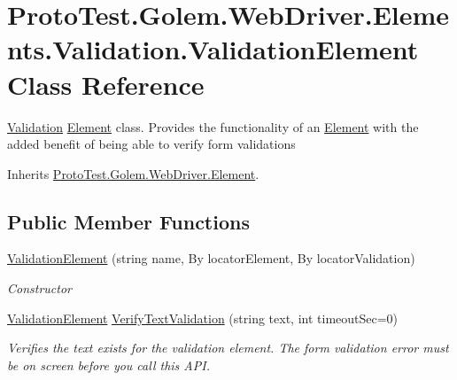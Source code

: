 \hypertarget{class_proto_test_1_1_golem_1_1_web_driver_1_1_elements_1_1_validation_1_1_validation_element}{\section{Proto\-Test.\-Golem.\-Web\-Driver.\-Elements.\-Validation.\-Validation\-Element Class Reference}
\label{class_proto_test_1_1_golem_1_1_web_driver_1_1_elements_1_1_validation_1_1_validation_element}
}


\hyperlink{namespace_proto_test_1_1_golem_1_1_web_driver_1_1_elements_1_1_validation}{Validation} \hyperlink{class_proto_test_1_1_golem_1_1_web_driver_1_1_element}{Element} class. Provides the functionality of an \hyperlink{class_proto_test_1_1_golem_1_1_web_driver_1_1_element}{Element} with the added benefit of being able to verify form validations  




Inherits \hyperlink{class_proto_test_1_1_golem_1_1_web_driver_1_1_element}{Proto\-Test.\-Golem.\-Web\-Driver.\-Element}.

\subsection*{Public Member Functions}
\begin{DoxyCompactItemize}
\item 
\hyperlink{class_proto_test_1_1_golem_1_1_web_driver_1_1_elements_1_1_validation_1_1_validation_element_a4e6e78fa9b8ead647c3b5c941dfe8276}{Validation\-Element} (string name, By locator\-Element, By locator\-Validation)
\begin{DoxyCompactList}\small\item\em Constructor \end{DoxyCompactList}\item 
\hyperlink{class_proto_test_1_1_golem_1_1_web_driver_1_1_elements_1_1_validation_1_1_validation_element}{Validation\-Element} \hyperlink{class_proto_test_1_1_golem_1_1_web_driver_1_1_elements_1_1_validation_1_1_validation_element_af36b5fd768f04aea3ebf4d45270d14b3}{Verify\-Text\-Validation} (string text, int timeout\-Sec=0)
\begin{DoxyCompactList}\small\item\em Verifies the text exists for the validation element. The form validation error must be on screen before you call this A\-P\-I. \end{DoxyCompactList}\end{DoxyCompactItemize}
